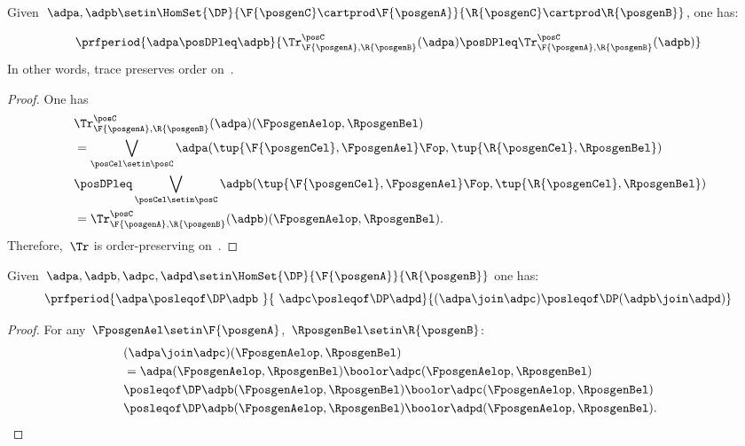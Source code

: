 \begin{lemma}
    \label{lem:trace_pres_order}
    Given~$\adpa,\adpb\setin \HomSet{\DP}{\F{\posgenC}\cartprod \F{\posgenA}}{\R{\posgenC}\cartprod \R{\posgenB}}$, one has:

    \begin{equation}
        \prfperiod{\adpa\posDPleq \adpb}{\Tr_{\F{\posgenA},\R{\posgenB}}^\posC(\adpa)\posDPleq \Tr_{\F{\posgenA},\R{\posgenB}}^\posC(\adpb)}
    \end{equation}
    In other words, trace preserves order on~\DP.
\end{lemma}

\begin{proof}
    One has
    \begin{equation}
        \label{eq:trace_pres_ord}
        \begin{aligned}
            ~ & \Tr_{\F{\posgenA},\R{\posgenB}}^\posC(\adpa)(\FposgenAelop,\RposgenBel) \\
              & = \bigvee_{\posCel\setin \posC}\adpa(\tup{\F{\posgenCel},\FposgenAel}\Fop,\tup{\R{\posgenCel},\RposgenBel}) \\
              & \posDPleq \bigvee_{\posCel\setin \posC}\adpb(\tup{\F{\posgenCel},\FposgenAel}\Fop,\tup{\R{\posgenCel},\RposgenBel}) \\
              & =\Tr_{\F{\posgenA},\R{\posgenB}}^\posC(\adpb)(\FposgenAelop,\RposgenBel).
        \end{aligned}
    \end{equation}
    Therefore,~$\Tr$ is order-preserving on~\DP.
\end{proof}

\begin{lemma}
    \label{lem:coprod_mon}
    Given~$\adpa,\adpb,\adpc,\adpd \setin \HomSet{\DP}{\F{\posgenA}}{\R{\posgenB}}$ one has:
    \begin{equation*}
        \prfperiod{\adpa\posleqof\DP \adpb\ }{\ \adpc\posleqof\DP\adpd}{(\adpa\join\adpc)\posleqof\DP (\adpb\join \adpd)}
    \end{equation*}
\end{lemma}
\begin{proof}
    For any~$\FposgenAel\setin \F{\posgenA}$,~$\RposgenBel\setin \R{\posgenB}$:
    \begin{equation*}
        \begin{aligned}
            ~ & (\adpa \join \adpc)(\FposgenAelop,\RposgenBel) \\
              & =\adpa(\FposgenAelop,\RposgenBel)\boolor \adpc(\FposgenAelop,\RposgenBel) \\
              & \posleqof\DP \adpb(\FposgenAelop,\RposgenBel)\boolor \adpc(\FposgenAelop,\RposgenBel) \\
              & \posleqof\DP \adpb(\FposgenAelop,\RposgenBel)\boolor \adpd(\FposgenAelop,\RposgenBel).
        \end{aligned}
    \end{equation*}
\end{proof}


